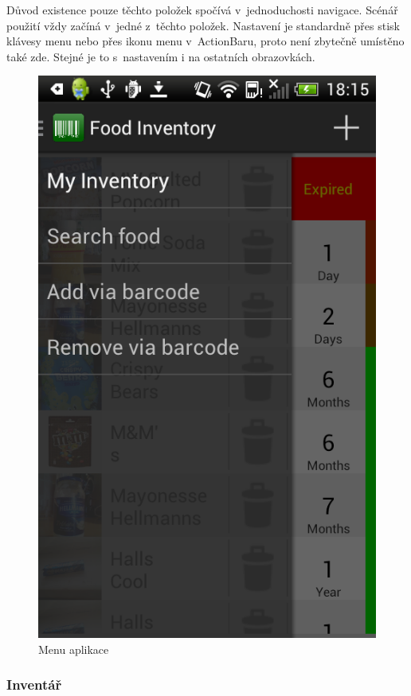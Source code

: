 \documentclass[thesis=B,czech]{FITthesis}[2013/10/20]
\begin{document}
Důvod existence pouze těchto položek spočívá v~jednoduchosti navigace. Scénář použití vždy začíná v~jedné z~těchto položek. Nastavení je standardně přes stisk klávesy menu nebo přes ikonu menu v~ActionBaru, proto není zbytečně umístěno také zde. Stejné je to s~nastavením i na ostatních obrazovkách.

\begin{figure}[H]
  \centering
  \includegraphics[scale=0.4]{screenshots/app_menu.png}
  \caption{Menu aplikace}
  \label{fig:AppMenu}
\end{figure}

\clearpage

\subsubsection{Inventář}
\end{document}
